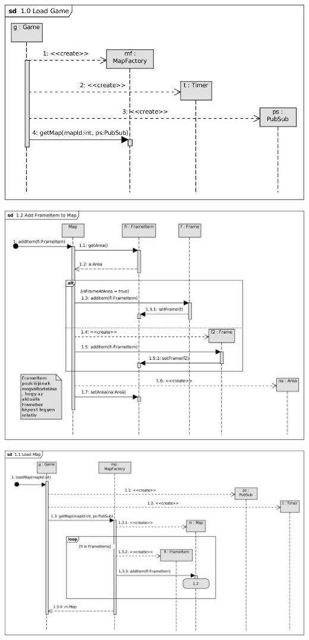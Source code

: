 \begin{center}\includegraphics[scale=1]{resources/10LoadGame.png}\end{center}
\begin{center}\includegraphics[scale=0.8]{resources/12AddFrameItemtoMap.png}\end{center}
\begin{center}\includegraphics[scale=1, angle=-90]{resources/11LoadMap.png}\end{center}

